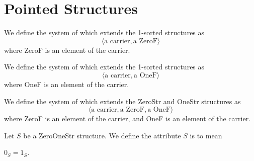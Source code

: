 \documentclass{article}
\begin{document}
\section{Pointed Structures}

\begin{definition}
We define the system of  which extends the 1-sorted
structures as
\[\langle \mbox{a carrier}, \mbox{a ZeroF}\rangle\]
where ZeroF is an element of the carrier.
\end{definition}

\begin{definition}
We define the system of  which extends the 1-sorted
structures as
\[\langle \mbox{a carrier}, \mbox{a OneF}\rangle\]
where OneF is an element of the carrier.
\end{definition}

\begin{definition}
We define the system of  which extends the ZeroStr
and OneStr structures as
\[\langle \mbox{a carrier}, \mbox{a ZeroF}, \mbox{a OneF}\rangle\]
where ZeroF is an element of the carrier,
and OneF is an element of the carrier.
\end{definition}



\begin{definition}
Let $S$ be a ZeroOneStr structure.
We define the attribute $S$ is  to mean
\begin{defn}
\item $0_{S}=1_{S}$.
\end{defn}
\end{definition}
\end{document}
